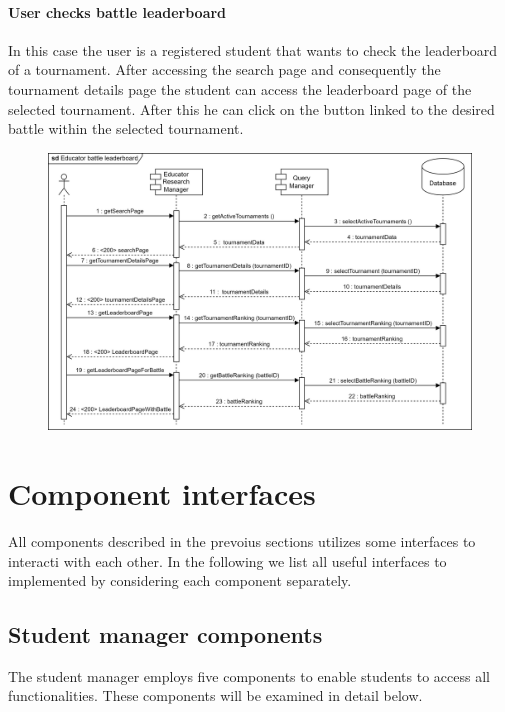 \documentclass[12pt, a4paper]{report}
\begin{document}
    \paragraph*{User checks battle leaderboard}
    In this case the user is a registered student that wants to check the leaderboard of a tournament. 
    After accessing the search page and consequently the tournament details page the student can access the leaderboard page of the selected tournament. 
    After this he can click on the button linked to the desired battle within the selected tournament. 
    \begin{figure}[H]
        \centering
        \includegraphics[width=1.0\linewidth]{images/eblrv.png}
    \end{figure}

    \section{Component interfaces}
    All components described in the prevoius sections utilizes some interfaces to interacti with each other. 
    In the following we list all useful interfaces to implemented by considering each component separately. 

    \subsection{Student manager components}
    The student manager employs five components to enable students to access all functionalities. 
    These components will be examined in detail below.
\end{document}
